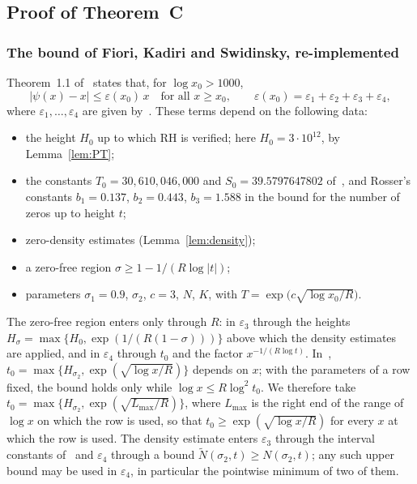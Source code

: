 \documentclass{amsart}
\theoremstyle{definition}
\theoremstyle{remark}
\theoremstyle{plain}
\numberwithin{equation}{section}
\newcommand{\eps}{\varepsilon}
\begin{document}
\subsection{Proof of Theorem~C}\label{sec:C}

\subsubsection{The bound of Fiori, Kadiri and Swidinsky, re-implemented}\label{sec:fks}
Theorem~1.1 of~\cite{FKS23} states that, for $\log x_0>1000$,
\[
|\psi(x)-x|\le\eps(x_0)\,x\quad\text{for all }x\ge x_0,\qquad \eps(x_0)=\eps_1+\eps_2+\eps_3+\eps_4,
\]
where $\eps_1,\dots,\eps_4$ are given by~\cite[(3.4), (3.8), (3.17), (3.22)]{FKS23}. These terms depend on the following data:
\begin{itemize}
\item the height $H_0$ up to which RH is verified; here $H_0=3\cdot10^{12}$, by Lemma~\ref{lem:PT};
\item the constants $T_0=30{,}610{,}046{,}000$ and $S_0=39.5797647802$ of~\cite{FKS23}, and Rosser's constants $b_1=0.137$, $b_2=0.443$, $b_3=1.588$ in the bound for the number of zeros up to height $t$;
\item zero-density estimates (Lemma~\ref{lem:density});
\item a zero-free region $\sigma\ge1-1/(R\log|t|)$;
\item parameters $\sigma_1=0.9$, $\sigma_2$, $c=3$, $N$, $K$, with $T=\exp\bigl(c\sqrt{\log x_0/R}\bigr)$.
\end{itemize}
The zero-free region enters only through $R$: in $\eps_3$ through the heights $H_\sigma=\max\{H_0,\exp(1/(R(1-\sigma)))\}$ above which the density estimates are applied, and in $\eps_4$ through $t_0$ and the factor $x^{-1/(R\log t)}$. In~\cite{FKS23}, $t_0=\max\{H_{\sigma_2},\exp(\sqrt{\log x/R})\}$ depends on $x$; with the parameters of a row fixed, the bound holds only while $\log x\le R\log^2t_0$. We therefore take $t_0=\max\{H_{\sigma_2},\exp(\sqrt{L_{\max}/R})\}$, where $L_{\max}$ is the right end of the range of $\log x$ on which the row is used, so that $t_0\ge\exp(\sqrt{\log x/R})$ for every $x$ at which the row is used. The density estimate enters $\eps_3$ through the interval constants of~\cite[Table~8]{FKS23} and $\eps_4$ through a bound $\widetilde N(\sigma_2,t)\ge N(\sigma_2,t)$; any such upper bound may be used in $\eps_4$, in particular the pointwise minimum of two of them.
\end{document}
